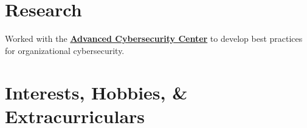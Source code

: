 \documentclass[letterpaper]{deedy-resume} %
\begin{document}
\begin{minipage}[t]{0.66\textwidth}






\section{Research}


Worked with the \textbf{\href{http://www.acscenter.org/}{Advanced Cybersecurity Center}} to develop best practices for organizational cybersecurity.

\sectionspace %






\section{Interests, Hobbies, \& Extracurriculars}


\end{minipage}
\end{document}
